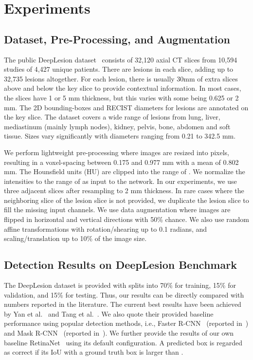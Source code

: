 \documentclass[runningheads,a4paper]{llncs}
\begin{document}
\section{Experiments}
\label{sec:experiments}

\subsection{Dataset, Pre-Processing, and Augmentation}
The public DeepLesion dataset~\cite{yan2018deep} consists of 32,120 axial CT slices from 10,594 studies of 4,427 unique patients. There are  lesions in each slice, adding up to 32,735 lesions altogether. 
For each lesion, there is usually 30mm of extra slices above and below the key slice to provide contextual information.
In most cases, the slices have 1 or 5 mm thickness, but this varies with some being 0.625 or 2 mm.
The 2D bounding-boxes and RECIST diameters for lesions are annotated on the key slice.
The dataset covers a wide range of lesions from lung, liver, mediastinum (mainly lymph nodes), kidney, pelvis, bone, abdomen and soft tissue.
Sizes vary significantly with diameters ranging from 0.21 to 342.5 mm.

We perform lightweight pre-processing where images are resized into  pixels, resulting in a voxel-spacing between 0.175 and 0.977 mm with a mean of 0.802 mm. The Hounsfield units (HU) are clipped into the range of . We normalize the intensities to the range of  as input to the network.
In our experiments, we use three adjacent slices after resampling to 2 mm thickness. In rare cases where the neighboring slice of the lesion slice is not provided, we duplicate the lesion slice to fill the missing input channels. 
We use data augmentation where images are flipped in horizontal and vertical directions with 50\% chance. We also use random affine transformations with rotation/shearing up to 0.1 radians, and scaling/translation up to 10\% of the image size.








\vspace{-3mm}
\subsection{Detection Results on DeepLesion Benchmark}

The DeepLesion dataset is provided with splits into 70\% for training, 15\% for validation, and 15\% for testing. Thus, our results can be directly compared with numbers reported in the literature. 
The current best results have been achieved by Yan et al.~\cite{yan20183dce} and  Tang et al.~\cite{tang2019uldor}. We also quote their provided baseline performance using popular detection methods, i.e., Faster R-CNN~\cite{ren2015faster} (reported in~\cite{yan20183dce}) and Mask R-CNN~\cite{he2017mask} (reported in~\cite{tang2019uldor}). We further provide the results of our own baseline RetinaNet~\cite{lin2017focal} using its default configuration.
A predicted box is regarded as correct if its IoU
with a ground truth box is larger than . 
\end{document}
